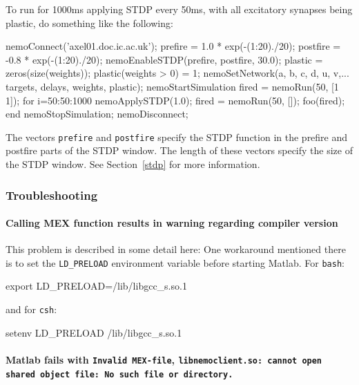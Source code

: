 \documentclass[a4paper]{article}
\newcommand{\code}[1]{\texttt{#1}}
\newcommand{\command}[1]{\texttt{#1}}
\begin{document}
To run for 1000ms applying STDP every 50ms, with all excitatory synapses being plastic, 
	do something like the following:

\begin{matlab}

nemoConnect('axel01.doc.ic.ac.uk');
prefire = 1.0 * exp(-(1:20)./20);
postfire = -0.8 * exp(-(1:20)./20);
nemoEnableSTDP(prefire, postfire, 30.0);
plastic = zeros(size(weights));
plastic(weights > 0) = 1;
nemoSetNetwork(a, b, c, d, u, v,...
                targets, delays, weights, plastic);
nemoStartSimulation
fired = nemoRun(50, [1 1]);
for i=50:50:1000
	nemoApplySTDP(1.0);
	fired = nemoRun(50, []);
	foo(fired);
end
nemoStopSimulation;
nemoDisconnect;
\end{matlab}

The vectors \code{prefire} and \code{postfire} specify the STDP function in the prefire and postfire parts of the STDP window. 
The length of these vectors specify the size of the STDP window.
See Section~\ref{stdp} for more information.


\subsubsection{Troubleshooting}

\paragraph{Calling MEX function results in warning regarding compiler version}

This problem is described in some detail here: 
One workaround mentioned there is to set the \code{LD\_PRELOAD} environment variable
before starting Matlab. For \command{bash}:

\begin{shell}
export LD_PRELOAD=/lib/libgcc_s.so.1
\end{shell}
and for \command{csh}:
\begin{shell}
setenv LD_PRELOAD /lib/libgcc_s.so.1
\end{shell}

\paragraph{Matlab fails with \texttt{Invalid MEX-file}, \texttt{libnemoclient.so: cannot open shared object file: No such file or directory.}}
\end{document}
